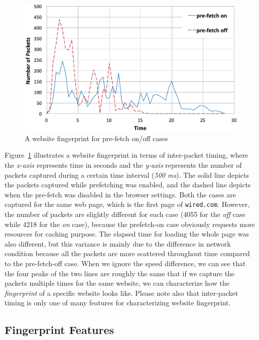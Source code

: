 \begin{figure}[h]
\includegraphics[width=0.95\columnwidth]{figures/prefetch.png}
\centering
\caption{A website fingerprint for pre-fetch on/off cases}
\label{fig:prefetch}
\end{figure}

Figure~\ref{fig:prefetch} illustrates a website fingerprint in terms of inter-packet timing, where the {\it x-axis} represents time in seconds and the {\it y-axis} represents the number of packets captured during a certain time interval ({\it 500 ms}).
The solid line depicts the packets captured while prefetching was enabled, and the dashed line depicts when the pre-fetch was disabled in the browser settings.
Both the cases are captured for the same web page, which is the first page of {\tt wired.com}.
However, the number of packets are slightly different for each case (4055 for the {\it off} case while 4218 for the {\it on} case), because the prefetch-on case obviously requests more resources for caching purpose. 
The elapsed time for loading the whole page was also different, but this variance is mainly due to the difference in network condition because all the packets are more scattered throughout time compared to the pre-fetch-off case.
When we ignore the speed difference, we can see that the four peaks of the two lines are roughly the same that if we capture the packets multiple times for the same website, we can characterize how the {\it fingerprint} of a specific website looks like.
Please note also that inter-packet timing is only one of many features for characterizing website fingerprint.


\subsection{Fingerprint Features}

